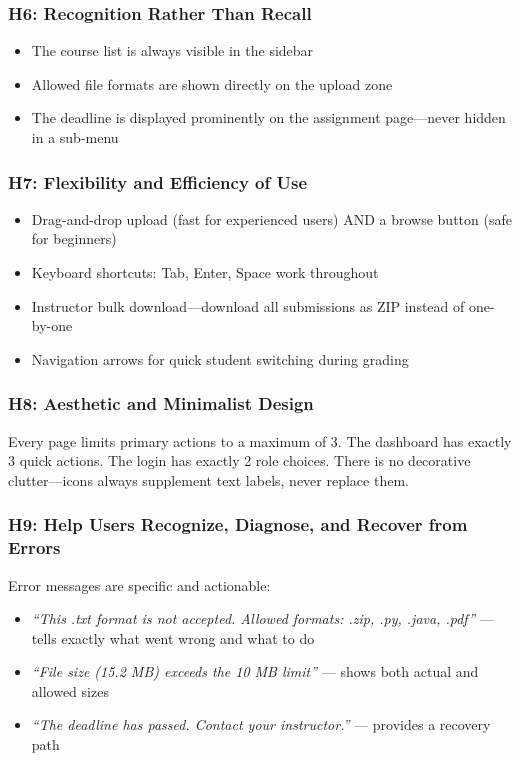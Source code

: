 \documentclass[12pt, a4paper]{article}
\begin{document}
\subsubsection{H6: Recognition Rather Than Recall}

\begin{itemize}[noitemsep]
  \item The course list is always visible in the sidebar
  \item Allowed file formats are shown directly on the upload zone
  \item The deadline is displayed prominently on the assignment page—never hidden in a sub-menu
\end{itemize}

\subsubsection{H7: Flexibility and Efficiency of Use}

\begin{itemize}[noitemsep]
  \item Drag-and-drop upload (fast for experienced users) AND a browse button (safe for beginners)
  \item Keyboard shortcuts: Tab, Enter, Space work throughout
  \item Instructor bulk download—download all submissions as ZIP instead of one-by-one
  \item Navigation arrows for quick student switching during grading
\end{itemize}

\subsubsection{H8: Aesthetic and Minimalist Design}

Every page limits primary actions to a maximum of 3. The dashboard has exactly 3 quick actions. The login has exactly 2 role choices. There is no decorative clutter—icons always supplement text labels, never replace them.

\subsubsection{H9: Help Users Recognize, Diagnose, and Recover from Errors}

Error messages are specific and actionable:
\begin{itemize}[noitemsep]
  \item \textit{``This .txt format is not accepted. Allowed formats: .zip, .py, .java, .pdf''} — tells exactly what went wrong and what to do
  \item \textit{``File size (15.2 MB) exceeds the 10 MB limit''} — shows both actual and allowed sizes
  \item \textit{``The deadline has passed. Contact your instructor.''} — provides a recovery path
\end{itemize}
\end{document}
